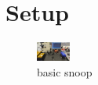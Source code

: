 \section{Setup}
\label{sec:setup}


\begin{figure}[H]
    \centering
    \includegraphics[width=0.1\textwidth]{graphics/basic-setup.jpg}
    \caption{basic snoop}
    \label{fig:setup:basic}
\end{figure}